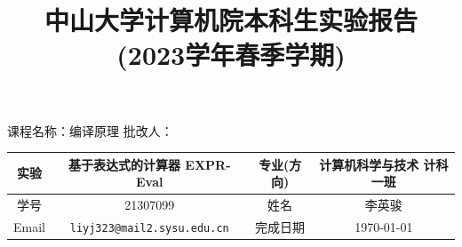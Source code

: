 \documentclass{article}
\title{中山大学计算机院本科生实验报告\\
    (2023学年春季学期)
}
\begin{document}
\maketitle
课程名称：编译原理 \qquad\qquad\qquad\qquad\qquad\qquad
批改人：
\begin{table}[h]
    \centering
    \begin{tabular}{|c|c|c|c|} \hline
        实验    & 基于表达式的计算器 EXPR-Eval                & 专业(方向) & 计算机科学与技术 计科一班 \\ \hline
        学号    & 21307099                           & 姓名     & 李英骏           \\\hline
        Email & \texttt{liyj323@mail2.sysu.edu.cn} & 完成日期   & \today        \\\hline
    \end{tabular}
\end{table}
\tableofcontents

\newpage
\end{document}

